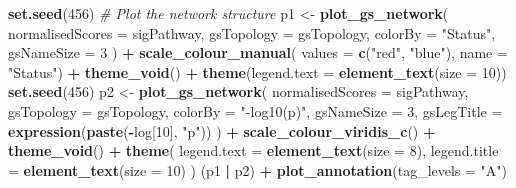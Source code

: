 \documentclass[9pt,a4paper,]{extarticle}
\newenvironment{Shaded}{\begin{snugshade}}{\end{snugshade}}
\newcommand{\AttributeTok}[1]{\textcolor[rgb]{0.13,0.29,0.53}{#1}}
\newcommand{\CommentTok}[1]{\textcolor[rgb]{0.56,0.35,0.01}{\textit{#1}}}
\newcommand{\DecValTok}[1]{\textcolor[rgb]{0.00,0.00,0.81}{#1}}
\newcommand{\FunctionTok}[1]{\textcolor[rgb]{0.13,0.29,0.53}{\textbf{#1}}}
\newcommand{\NormalTok}[1]{#1}
\newcommand{\OtherTok}[1]{\textcolor[rgb]{0.56,0.35,0.01}{#1}}
\newcommand{\SpecialCharTok}[1]{\textcolor[rgb]{0.81,0.36,0.00}{\textbf{#1}}}
\newcommand{\StringTok}[1]{\textcolor[rgb]{0.31,0.60,0.02}{#1}}
\begin{document}
\begin{Shaded}
\begin{Highlighting}[]
\FunctionTok{set.seed}\NormalTok{(}\DecValTok{456}\NormalTok{)}
\CommentTok{\# Plot the network structure}
\NormalTok{p1 }\OtherTok{\textless{}{-}} \FunctionTok{plot\_gs\_network}\NormalTok{(}
  \AttributeTok{normalisedScores =}\NormalTok{ sigPathway, }
  \AttributeTok{gsTopology =}\NormalTok{ gsTopology, }
  \AttributeTok{colorBy =} \StringTok{"Status"}\NormalTok{,}
  \AttributeTok{gsNameSize =} \DecValTok{3}
\NormalTok{) }\SpecialCharTok{+}
  \FunctionTok{scale\_colour\_manual}\NormalTok{(}
      \AttributeTok{values =} \FunctionTok{c}\NormalTok{(}\StringTok{"red"}\NormalTok{, }\StringTok{"blue"}\NormalTok{), }
      \AttributeTok{name =} \StringTok{"Status"}\NormalTok{) }\SpecialCharTok{+}
  \FunctionTok{theme\_void}\NormalTok{() }\SpecialCharTok{+}
  \FunctionTok{theme}\NormalTok{(}\AttributeTok{legend.text =} \FunctionTok{element\_text}\NormalTok{(}\AttributeTok{size =} \DecValTok{10}\NormalTok{)) }
\FunctionTok{set.seed}\NormalTok{(}\DecValTok{456}\NormalTok{)}
\NormalTok{p2 }\OtherTok{\textless{}{-}} \FunctionTok{plot\_gs\_network}\NormalTok{(}
  \AttributeTok{normalisedScores =}\NormalTok{ sigPathway,}
  \AttributeTok{gsTopology =}\NormalTok{ gsTopology, }
  \AttributeTok{colorBy  =} \StringTok{"{-}log10(p)"}\NormalTok{, }
  \AttributeTok{gsNameSize =} \DecValTok{3}\NormalTok{,}
  \AttributeTok{gsLegTitle =} \FunctionTok{expression}\NormalTok{(}\FunctionTok{paste}\NormalTok{(}\SpecialCharTok{{-}}\NormalTok{log[}\DecValTok{10}\NormalTok{], }\StringTok{"p"}\NormalTok{))}
\NormalTok{) }\SpecialCharTok{+}
  \FunctionTok{scale\_colour\_viridis\_c}\NormalTok{() }\SpecialCharTok{+}
  \FunctionTok{theme\_void}\NormalTok{() }\SpecialCharTok{+}
  \FunctionTok{theme}\NormalTok{(}
    \AttributeTok{legend.text =} \FunctionTok{element\_text}\NormalTok{(}\AttributeTok{size =} \DecValTok{8}\NormalTok{),}
    \AttributeTok{legend.title =} \FunctionTok{element\_text}\NormalTok{(}\AttributeTok{size =} \DecValTok{10}\NormalTok{)}
\NormalTok{  ) }
\NormalTok{(p1 }\SpecialCharTok{|}\NormalTok{ p2) }\SpecialCharTok{+} 
    \FunctionTok{plot\_annotation}\NormalTok{(}\AttributeTok{tag\_levels =} \StringTok{"A"}\NormalTok{) }
\end{Highlighting}
\end{Shaded}
\end{document}
